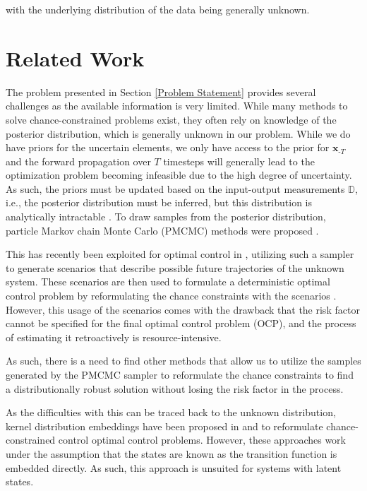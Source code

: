 with the underlying distribution of the data being generally unknown.

\section{Related Work} \label{Related Work}


The problem presented in Section \ref{Problem Statement} provides several challenges as the available information is very limited. While many methods to solve chance-constrained problems exist, they often rely on knowledge of the posterior distribution, which is generally unknown in our problem. While we do have priors for the uncertain elements, we only have access to the prior for $\boldsymbol{x}_{\text{-}T}$ and the forward propagation over $T$ timesteps will generally lead to the optimization problem becoming infeasible due to the high degree of uncertainty. As such, the priors must be updated based on the input-output measurements $\mathbb{D}$, i.e., the posterior distribution must be inferred, but this distribution is analytically intractable \cite{Andrieu_10}. To draw samples from the posterior distribution, particle Markov chain Monte Carlo (PMCMC) methods were proposed \cite{Andrieu_10}. 

This has recently been exploited for optimal control in \cite{Robert_24}, utilizing such a sampler to generate scenarios that describe possible future trajectories of the unknown system. These scenarios are then used to formulate a deterministic optimal control problem by reformulating the chance constraints with the scenarios \cite{Garatti_22}. However, this usage of the scenarios comes with the drawback that the risk factor cannot be specified for the final optimal control problem (OCP), and the process of estimating it retroactively is resource-intensive.

As such, there is a need to find other methods that allow us to utilize the samples generated by the PMCMC sampler to reformulate the chance constraints to find a distributionally robust solution without losing the risk factor in the process. 

As the difficulties with this can be traced back to the unknown distribution, kernel distribution embeddings have been proposed in \cite{Adam_21} and \cite{Adam_22} to reformulate chance-constrained control optimal control problems. However, these approaches work under the assumption that the states are known as the transition function is embedded directly. As such, this approach is unsuited for systems with latent states.


